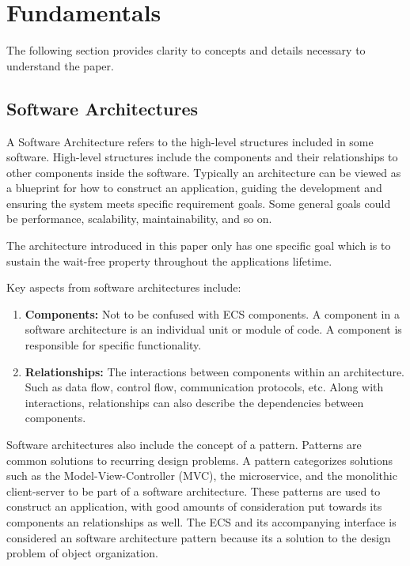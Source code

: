 \section{Fundamentals}

The following section provides clarity to concepts and details necessary to understand the paper.
\subsection{Software Architectures}
A Software Architecture refers to the high-level structures included in some software. High-level structures include the components and their relationships to other components inside the software. Typically an architecture can be viewed as a blueprint for how to construct an application, guiding the development and ensuring the system meets specific requirement goals. Some general goals could be performance, scalability, maintainability, and so on. 

The architecture introduced in this paper only has one specific goal which is to sustain the wait-free property throughout the applications lifetime.

Key aspects from software architectures include:

\begin{enumerate}
    \item \textbf{Components:} Not to be confused with ECS components. A component in a software architecture is an individual unit or module of code. A component is responsible for specific functionality.
    \item \textbf{Relationships:} The interactions between components within an architecture. Such as data flow, control flow, communication protocols, etc. Along with interactions, relationships can also describe the dependencies between components.
\end{enumerate}

Software architectures also include the concept of a pattern. Patterns are common solutions to recurring design problems. A pattern categorizes solutions such as the Model-View-Controller (MVC), the microservice, and the monolithic client-server to be part of a software architecture. These patterns are used to construct an application, with good amounts of consideration put towards its components an relationships as well. The ECS and its accompanying interface is considered an software architecture pattern because its a solution to the design problem of object organization.

